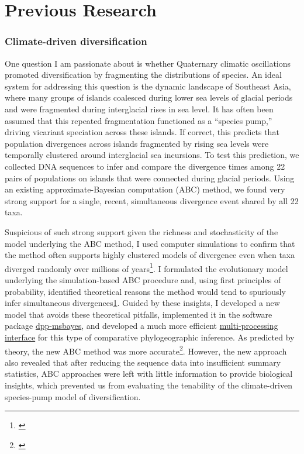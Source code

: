 \section*{Previous Research}
\subsubsection*{Climate-driven diversification}
One question I am passionate about is whether Quaternary climatic oscillations
promoted diversification by fragmenting the distributions of species.
An ideal system for addressing this question is the dynamic landscape of
Southeast Asia, where many groups of islands coalesced during lower sea levels
of glacial periods and were fragmented during interglacial rises in sea level.
It has often been assumed that this repeated fragmentation functioned as a
``species pump,'' driving vicariant speciation across these islands.
If correct, this predicts that population divergences across islands fragmented
by rising sea levels were temporally clustered around interglacial sea
incursions.
To test this prediction, we collected DNA sequences to infer and compare the
divergence times among 22 pairs of populations on islands that were connected
during glacial periods.
Using an existing approximate-Bayesian computation (ABC) method, we found very
strong support
for a single, recent, simultaneous divergence event shared by all 22 taxa.

Suspicious of such strong support given the richness and stochasticity of the
model underlying the ABC method, I used computer simulations to confirm that
the method often supports highly clustered models of divergence even when taxa
diverged randomly over millions of years\footnote{\label{Oaks12}\hspace{-0.8em}}.
I formulated the evolutionary model underlying the simulation-based ABC
procedure and, using first principles of probability, identified theoretical
reasons the method would tend to spuriously infer simultaneous
divergences\cref{Oaks12}.
Guided by these insights, I developed a new model that avoids these theoretical
pitfalls,
implemented it in the software package
\href{https://github.com/joaks1/dpp-msbayes}{dpp-msbayes},
and developed a much more efficient 
\href{https://joaks1.github.io/PyMsBayes/}{multi-processing interface}
for this type of comparative phylogeographic inference.
As predicted by theory, the new ABC method was more
accurate\footnote{\label{Oaks14dpp}\hspace{-0.8em}}.
However, the new approach also revealed that after reducing the sequence data
into insufficient summary statistics, ABC approaches were left with little
information to provide biological insights,
which prevented us from evaluating the tenability of the climate-driven
species-pump model of diversification.

